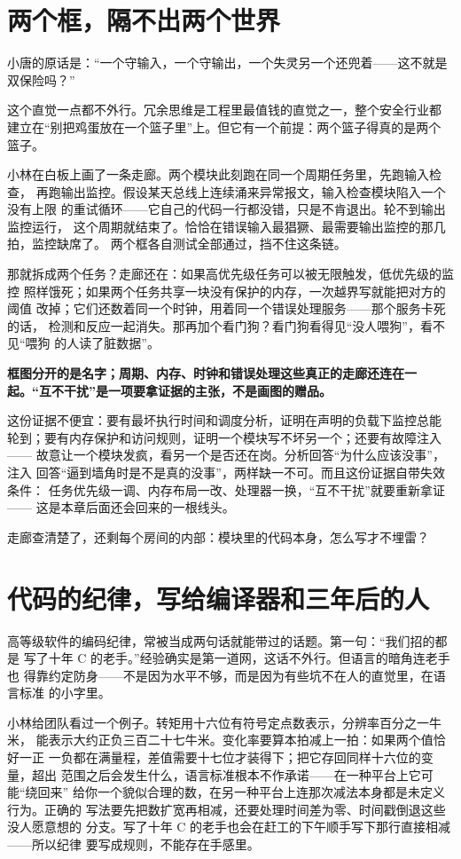 \section{两个框，隔不出两个世界}

小唐的原话是：“一个守输入，一个守输出，一个失灵另一个还兜着——这不就是
双保险吗？”

这个直觉一点都不外行。冗余思维是工程里最值钱的直觉之一，整个安全行业都
建立在“别把鸡蛋放在一个篮子里”上。但它有一个前提：两个篮子得真的是两个
篮子。

小林在白板上画了一条走廊。两个模块此刻跑在同一个周期任务里，先跑输入检查，
再跑输出监控。假设某天总线上连续涌来异常报文，输入检查模块陷入一个没有上限
的重试循环——它自己的代码一行都没错，只是不肯退出。轮不到输出监控运行，
这个周期就结束了。恰恰在错误输入最猖獗、最需要输出监控的那几拍，监控缺席了。
两个框各自测试全部通过，挡不住这条链。

那就拆成两个任务？走廊还在：如果高优先级任务可以被无限触发，低优先级的监控
照样饿死；如果两个任务共享一块没有保护的内存，一次越界写就能把对方的阈值
改掉；它们还数着同一个时钟，用着同一个错误处理服务——那个服务卡死的话，
检测和反应一起消失。那再加个看门狗？看门狗看得见“没人喂狗”，看不见“喂狗
的人读了脏数据”。

\textbf{框图分开的是名字；周期、内存、时钟和错误处理这些真正的走廊还连在一起。“互不干扰”是一项要拿证据的主张，不是画图的赠品。}

这份证据不便宜：要有最坏执行时间和调度分析，证明在声明的负载下监控总能
轮到；要有内存保护和访问规则，证明一个模块写不坏另一个；还要有故障注入——
故意让一个模块发疯，看另一个是否还在岗。分析回答“为什么应该没事”，注入
回答“逼到墙角时是不是真的没事”，两样缺一不可。而且这份证据自带失效条件：
任务优先级一调、内存布局一改、处理器一换，“互不干扰”就要重新拿证——
这是本章后面还会回来的一根线头。

走廊查清楚了，还剩每个房间的内部：模块里的代码本身，怎么写才不埋雷？

\section{代码的纪律，写给编译器和三年后的人}

高等级软件的编码纪律，常被当成两句话就能带过的话题。第一句：“我们招的都是
写了十年 C 的老手。”经验确实是第一道网，这话不外行。但语言的暗角连老手也
得靠约定防身——不是因为水平不够，而是因为有些坑不在人的直觉里，在语言标准
的小字里。

小林给团队看过一个例子。转矩用十六位有符号定点数表示，分辨率百分之一牛米，
能表示大约正负三百二十七牛米。变化率要算本拍减上一拍：如果两个值恰好一正
一负都在满量程，差值需要十七位才装得下；把它存回同样十六位的变量，超出
范围之后会发生什么，语言标准根本不作承诺——在一种平台上它可能“绕回来”
给你一个貌似合理的数，在另一种平台上连那次减法本身都是未定义行为。正确的
写法要先把数扩宽再相减，还要处理时间差为零、时间戳倒退这些没人愿意想的
分支。写了十年 C 的老手也会在赶工的下午顺手写下那行直接相减——所以纪律
要写成规则，不能存在手感里。

